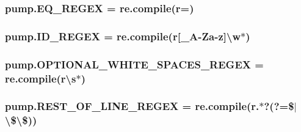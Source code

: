 \subsubsection[{\texorpdfstring{E\+Q\+\_\+\+R\+E\+G\+EX}{EQ_REGEX}}]{\setlength{\rightskip}{0pt plus 5cm}pump.\+E\+Q\+\_\+\+R\+E\+G\+EX = re.\+compile(r\textquotesingle{}=\textquotesingle{})}\hypertarget{namespacepump_a6397ed9bab62b5c6f60a6626f6b287e0}{}\label{namespacepump_a6397ed9bab62b5c6f60a6626f6b287e0}
\subsubsection[{\texorpdfstring{I\+D\+\_\+\+R\+E\+G\+EX}{ID_REGEX}}]{\setlength{\rightskip}{0pt plus 5cm}pump.\+I\+D\+\_\+\+R\+E\+G\+EX = re.\+compile(r\textquotesingle{}\mbox{[}\+\_\+A-\/Za-\/z\mbox{]}\textbackslash{}w$\ast$\textquotesingle{})}\hypertarget{namespacepump_a8e008923b6c378b8d3df611fb07d6dda}{}\label{namespacepump_a8e008923b6c378b8d3df611fb07d6dda}
\subsubsection[{\texorpdfstring{O\+P\+T\+I\+O\+N\+A\+L\+\_\+\+W\+H\+I\+T\+E\+\_\+\+S\+P\+A\+C\+E\+S\+\_\+\+R\+E\+G\+EX}{OPTIONAL_WHITE_SPACES_REGEX}}]{\setlength{\rightskip}{0pt plus 5cm}pump.\+O\+P\+T\+I\+O\+N\+A\+L\+\_\+\+W\+H\+I\+T\+E\+\_\+\+S\+P\+A\+C\+E\+S\+\_\+\+R\+E\+G\+EX = re.\+compile(r\textquotesingle{}\textbackslash{}s$\ast$\textquotesingle{})}\hypertarget{namespacepump_a81f03eaffd2c0f4c6a453a0b179e51ca}{}\label{namespacepump_a81f03eaffd2c0f4c6a453a0b179e51ca}
\subsubsection[{\texorpdfstring{R\+E\+S\+T\+\_\+\+O\+F\+\_\+\+L\+I\+N\+E\+\_\+\+R\+E\+G\+EX}{REST_OF_LINE_REGEX}}]{\setlength{\rightskip}{0pt plus 5cm}pump.\+R\+E\+S\+T\+\_\+\+O\+F\+\_\+\+L\+I\+N\+E\+\_\+\+R\+E\+G\+EX = re.\+compile(r\textquotesingle{}.$\ast$?(?=\$$\vert$\textbackslash{}\$\textbackslash{}\$)\textquotesingle{})}\hypertarget{namespacepump_a4c1f68b32fcb8366051b574cf2e6aef1}{}\label{namespacepump_a4c1f68b32fcb8366051b574cf2e6aef1}
